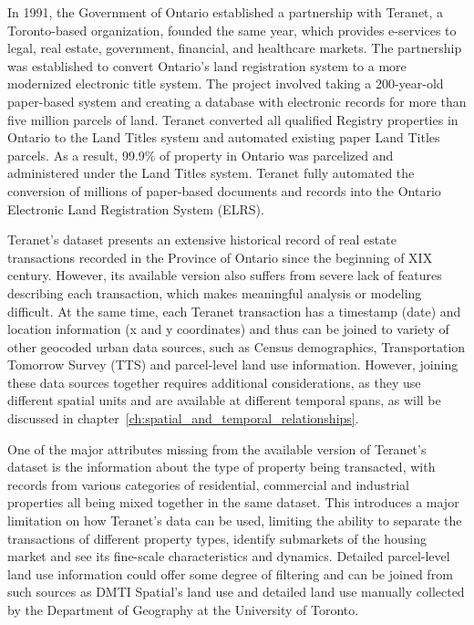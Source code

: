 In 1991, the Government of Ontario established a partnership with Teranet, a Toronto-based organization, founded the same year, which provides e-services to legal, real estate, government, financial, and healthcare markets.
The partnership was established to convert Ontario's land registration system to a more modernized electronic title system.
The project involved taking a 200-year-old paper-based system and creating a database with electronic records for more than five million parcels of land.
Teranet converted all qualified Registry properties in Ontario to the Land Titles system and automated existing paper Land Titles parcels.
As a result, 99.9\% of property in Ontario was parcelized and administered under the Land Titles system.
Teranet fully automated the conversion of millions of paper-based documents and records into the Ontario Electronic Land Registration System (ELRS)\cite{TeranetEnterprisesInc.2019}.

Teranet's dataset presents an extensive historical record of real estate transactions recorded in the Province of Ontario since the beginning of XIX century.
However, its available version also suffers from severe lack of features describing each transaction, which makes meaningful analysis or modeling difficult.
At the same time, each Teranet transaction has a timestamp (date) and location information (x and y coordinates) and thus can be joined to variety of other geocoded urban data sources, such as Census demographics, Transportation Tomorrow Survey (TTS) and parcel-level land use information.
However, joining these data sources together requires additional considerations, as they use different spatial units and are available at different temporal spans, as will be discussed in chapter~\ref{ch:spatial_and_temporal_relationships}.

One of the major attributes missing from the available version of Teranet's dataset is the information about the type of property being transacted, with records from various categories of residential, commercial and industrial properties all being mixed together in the same dataset.
This introduces a major limitation on how Teranet's data can be used, limiting the ability to separate the transactions of different property types, identify submarkets of the housing market and see its fine-scale characteristics and dynamics.
Detailed parcel-level land use information could offer some degree of filtering and can be joined from such sources as DMTI Spatial's land use and detailed land use manually collected by the Department of Geography at the University of Toronto.

